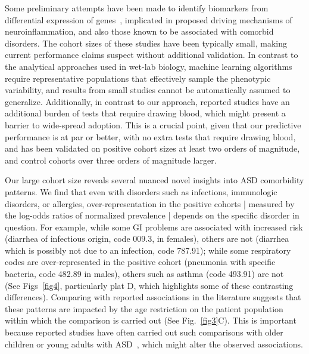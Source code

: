 \documentclass[onecolumn,,10pt]{IEEEtran}
\def\treatment{positive\xspace}
\begin{document}
Some preliminary attempts have been made to
identify  biomarkers from differential expression  of
 genes~\cite{pmid22917206,pmid25739104,pmid24363828,pmid23227143},
 implicated in proposed driving mechanisms of neuroinflammation, and also those known to be associated with comorbid disorders. The cohort sizes of these studies have been typically small, making current performance claims suspect without additional validation. In contrast to the analytical approaches used in  wet-lab biology, machine learning algorithms require representative populations that effectively sample the phenotypic variability, and results from small studies cannot be automatically assumed to generalize. Additionally, in contrast to our approach, reported studies have an additional burden of tests that require drawing blood, which might present a barrier to wide-spread adoption.
This is a crucial point, given that our predictive performance is at par or better, with no extra tests that require drawing blood, and has been validated on \treatment cohort sizes at least two orders of magnitude, and control cohorts over three orders of magnitude larger.

Our large cohort size reveals several nuanced novel insights into ASD comorbidity patterns. We find that even with disorders such as infections, immunologic disorders, or allergies, over-representation in the \treatment cohorts | measured by the log-odds ratios of normalized prevalence | depends on the specific disorder in question. For example, while some GI problems are associated with increased risk (diarrhea of infectious origin, code 009.3, in females), others are not (diarrhea which is possibly not due to an infection, code 787.91); while some  respiratory codes are over-represented in the \treatment cohort (pneumonia with specific bacteria, code 482.89 in males), others such as asthma (code 493.91) are not~\cite{pmid25681541} (See Figs~\ref{fig4}, particularly plat D, which highlights some of these contrasting differences). Comparing with reported associations in the literature suggests that these patterns are impacted by the age restriction on the patient population within which the comparison is carried out (See Fig.~\ref{fig3}C). This is important because reported studies have often carried out such comparisons with older children or young adults with ASD~\cite{pmid25681541,pmid22511918}, which might alter the observed associations.
\end{document}

